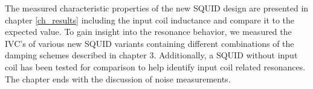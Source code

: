 The measured characteristic properties of the new SQUID design are presented in chapter \ref{ch_results} including the input coil inductance and compare it to the expected value. To gain insight into the resonance behavior, we measured the IVC's of various new SQUID variants containing different combinations of the damping schemes described in chapter 3. Additionally, a SQUID without input coil has been tested for comparison to help identify input coil related resonances. The chapter ends with the discussion of noise measurements. 
